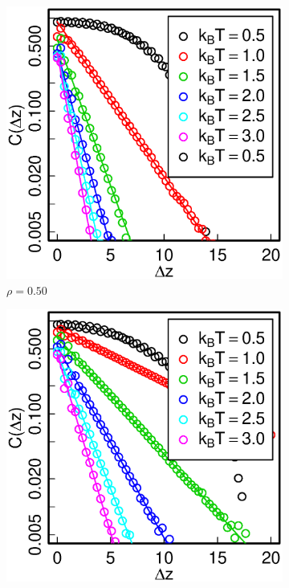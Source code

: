 \begin{figure}[h]
\begin{subfigure}[t]{0.32\textwidth}
	\includegraphics[width=\textwidth]{Images/distCor_50}
	\caption{$\rho = 0.50$}
\end{subfigure}
\begin{subfigure}[t]{0.32\textwidth}
	\centering
	\includegraphics[width=\textwidth]{Images/distCor_75}

\end{subfigure}
\end{figure}
